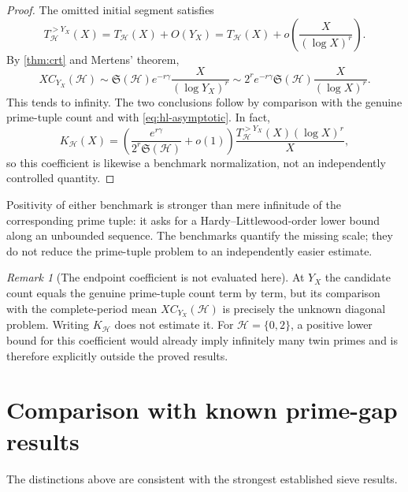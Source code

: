 \documentclass[11pt]{article}
\theoremstyle{definition}
\theoremstyle{remark}
\newtheorem{remark}[theorem]{Remark}
\newcommand{\cH}{\mathcal H}
\begin{document}
\begin{proof}
The omitted initial segment satisfies
\begin{equation}\label{eq:endpoint-prime-head}
    T_{\cH}^{>Y_X}(X)=T_{\cH}(X)+O(Y_X)
    =T_{\cH}(X)+o\left(\frac{X}{(\log X)^r}\right).
\end{equation}
By \cref{thm:crt} and Mertens' theorem,
\[
 X C_{Y_X}(\cH)
 \sim \mathfrak S(\cH)e^{-r\gamma}
       \frac{X}{(\log Y_X)^r}
 \sim 2^r e^{-r\gamma}\mathfrak S(\cH)
       \frac{X}{(\log X)^r}.
\]
This tends to infinity.  The two conclusions follow by comparison with the genuine prime-tuple count and with \eqref{eq:hl-asymptotic}.
In fact,
\begin{equation}\label{eq:endpoint-benchmark-identity}
 K_{\cH}(X)
 =\left(\frac{e^{r\gamma}}{2^r\mathfrak S(\cH)}+o(1)\right)
   \frac{T_{\cH}^{>Y_X}(X)(\log X)^r}{X},
\end{equation}
so this coefficient is likewise a benchmark normalization, not an independently controlled quantity.
\end{proof}

Positivity of either benchmark is stronger than mere infinitude of the corresponding prime tuple: it asks for a Hardy--Littlewood-order lower bound along an unbounded sequence.  The benchmarks quantify the missing scale; they do not reduce the prime-tuple problem to an independently easier estimate.

\begin{remark}[The endpoint coefficient is not evaluated here]\label{rem:endpoint-open}
At $Y_X$ the candidate count equals the genuine prime-tuple count term by term, but its comparison with the complete-period mean $XC_{Y_X}(\cH)$ is precisely the unknown diagonal problem.  Writing $K_{\cH}$ does not estimate it.  For $\cH=\{0,2\}$, a positive lower bound for this coefficient would already imply infinitely many twin primes and is therefore explicitly outside the proved results.
\end{remark}

\section{Comparison with known prime-gap results}\label{sec:known-boundary}

The distinctions above are consistent with the strongest established sieve results.
\end{document}
